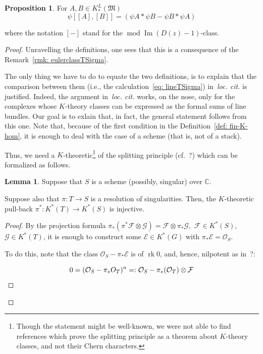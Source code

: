 \documentclass[12pt]{amsart}
\theoremstyle{definition}
\newtheorem{proposition}[definition]{Proposition}
\newtheorem{lemma}[definition]{Lemma}
\newcommand{\1}{\mathbf 1}
\newcommand{\FM}{{\mathfrak{M}}}
\begin{document}
\iffalse
\begin{proposition} For $A, B \in K_*^L(\FM)$
$$\psi[[A], [B]] = (\psi A*\psi B - \psi B* \psi A)$$

where the notation $[-]$ stand for the $\operatorname{mod} \operatorname{Im}(D(z)-1)$-class.
\end{proposition}

\begin{proof}
Unravelling the definitions, one sees that this is a consequence of the Remark~\ref{rmk: eulerclassTSigma}.

The only thing  we have to do to equate the two definitions, is to explain that the comparison between them (i.e., the calculation~\ref{eq: lineTSigma}) in~\textit{loc. cit.} is justified. Indeed, the argument in~\textit{loc. cit.} works, on the nose, only for the complexes whose $K$-theory classes can be expressed as the formal sums of line bundles. Our goal is to exlain that, in fact, the general statement follows from this one. Note that, because of the first condition in the Definition~\ref{def: fin-K-hom}, it is enough to deal with the case of a scheme  (that is, not of a stack).

Thus, we need a $K$-theoretic\footnote{Though the statement might be well-known, we were not able to find references which prove the splitting principle as a theorem about $K$-theory classes, and not their Chern characters.} of the splitting principle (cf.~?) which can be formalized as follows. 

\begin{lemma}
Suppose that $S$ is a scheme (possibly, singular) over $\mathbb C$.

Suppose also that $\pi: T \to S$ is a resolution of singularities. Then, the $K$-theoretic pull-back $\pi^*: K^*(T) \to K^*(S)$ is injective.
\end{lemma}

\begin{proof}
By the projection formula $\pi_*(\pi^*\mathcal F \otimes \mathcal G) = \mathcal F \otimes \pi_*\mathcal G,$ $\mathcal F \in K^*(S),$ $\mathcal G \in K^*(T)$, it is enough to construct some $\mathcal E \in K^*(G)$ with $\pi_*\mathcal E = \mathcal O_S$.

To do this, note that the class $\mathcal O_S - \pi_*\mathcal E$ is of $\operatorname{rk} 0$, and, hence, nilpotent as in~?:

$$0 = (\mathcal O_S - \pi_*\mathcal \mathcal O_T)^n =: \mathcal O_S - \pi_*(\mathcal O_T) \otimes \mathcal F$$


\end{proof}
\end{proof}
\end{document}
